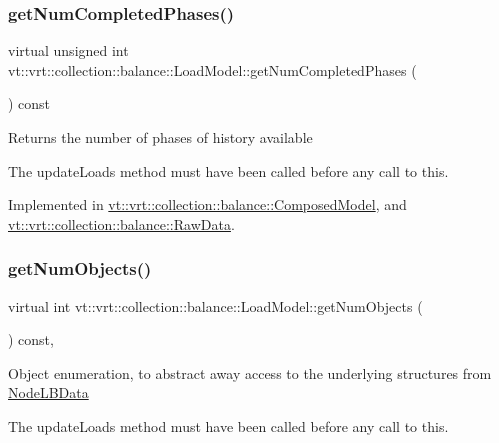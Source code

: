 \subsubsection{\texorpdfstring{get\+Num\+Completed\+Phases()}{getNumCompletedPhases()}}
{\footnotesize\ttfamily virtual unsigned int vt\+::vrt\+::collection\+::balance\+::\+Load\+Model\+::get\+Num\+Completed\+Phases (\begin{DoxyParamCaption}{ }\end{DoxyParamCaption}) const\hspace{0.3cm}{\ttfamily [pure virtual]}}

Returns the number of phases of history available

The {\ttfamily update\+Loads} method must have been called before any call to this. 

Implemented in \hyperlink{classvt_1_1vrt_1_1collection_1_1balance_1_1_composed_model_a85bd890eb6e94c85cbfeb9ef321139dc}{vt\+::vrt\+::collection\+::balance\+::\+Composed\+Model}, and \hyperlink{structvt_1_1vrt_1_1collection_1_1balance_1_1_raw_data_afc5ca3584a08924a4c5941b32aebb35e}{vt\+::vrt\+::collection\+::balance\+::\+Raw\+Data}.

\mbox{\label{structvt_1_1vrt_1_1collection_1_1balance_1_1_load_model_a438cd95f1c60b4232152335c4ee950bc}} 
\subsubsection{\texorpdfstring{get\+Num\+Objects()}{getNumObjects()}}
{\footnotesize\ttfamily virtual int vt\+::vrt\+::collection\+::balance\+::\+Load\+Model\+::get\+Num\+Objects (\begin{DoxyParamCaption}{ }\end{DoxyParamCaption}) const\hspace{0.3cm}{\ttfamily [inline]}, {\ttfamily [virtual]}}

Object enumeration, to abstract away access to the underlying structures from \hyperlink{structvt_1_1vrt_1_1collection_1_1balance_1_1_node_l_b_data}{Node\+L\+B\+Data}

The {\ttfamily update\+Loads} method must have been called before any call to this. 


